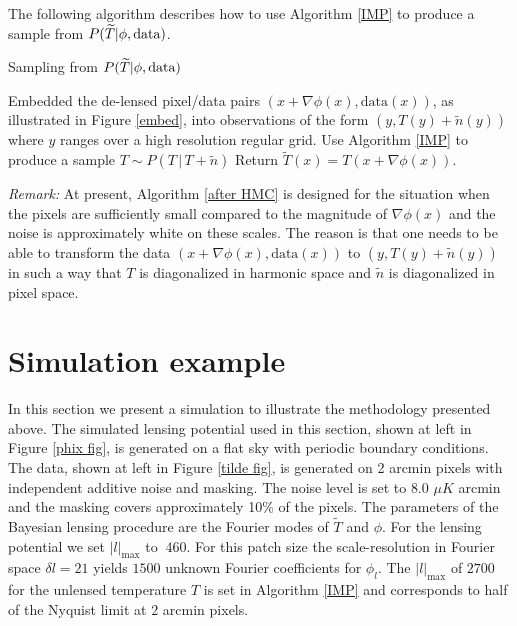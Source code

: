 \documentclass[noinfoline]{imsart}
\begin{document}
The following algorithm describes how to use Algorithm \ref{IMP} to produce a sample from $ P(\widetilde T |  \phi,\text{\rm data})$.

\begin{algorithm}[H]
\small
\caption{Sampling from $P(\widetilde T |  \phi,\text{\rm data})$}
\label{after HMC}
\begin{algorithmic}[1]
\State Embedded the de-lensed pixel/data pairs  $(x+\nabla\phi(x), \text{data}(x))$, as illustrated in Figure \ref{embed}, into observations of the form $(y, T(y)+\tilde n(y))$ where $y$ ranges over a high resolution regular grid.
\State Use Algorithm \ref{IMP} to produce a sample $T\sim P(T\,|\, T+\tilde n)$
\State Return $\widetilde T(x) = T(x+\nabla\phi(x))$.
\end{algorithmic}
\end{algorithm}




{\em Remark:} At present, Algorithm \ref{after HMC} is designed for the situation when the pixels are sufficiently small compared to the magnitude of $\nabla \phi(x)$ and the noise is approximately white on these scales.  The reason is that one needs to be able to transform the data $(x+\nabla\phi(x), \text{data}(x))$ to $(y, T(y) + \tilde n(y))$  in such a way that $T$ is diagonalized in harmonic space and $\tilde n$ is diagonalized in pixel space. 







%
%
\section{Simulation example}
\label{Section: simulation examples}

In this section we present a simulation to illustrate the methodology presented above. The simulated lensing potential used in this section, shown at left in Figure \ref{phix fig}, is generated on a flat sky with periodic boundary conditions. The data, shown at left in Figure \ref{tilde fig}, is generated on 2 arcmin pixels with independent additive noise and masking. The noise level is set to $8.0$ $\mu K$ arcmin and the masking covers approximately 10\% of the pixels.  The parameters of the Bayesian lensing procedure are the Fourier modes of $\widetilde T$ and $\phi$. For the lensing potential we set $|l|_\text{max}$ to $~460$. 
For this patch size the scale-resolution in Fourier space  $\delta l = 21$ yields $1500$ unknown Fourier coefficients for $\phi_l$. The $|l|_\text{max}$ of $2700$ for the unlensed temperature $T$ is set in Algorithm \ref{IMP} and corresponds to half of the Nyquist limit at $2$ arcmin pixels. 
\end{document}
